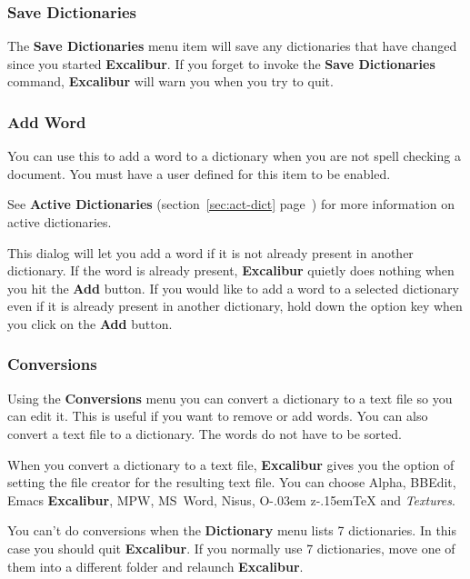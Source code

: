 ﻿\documentclass[11pt,titlepage]{article}
\newcommand{\ex}{\textbf{Excalibur}}
\newcommand{\oz}{O\kern-.03em z\kern-.15em\TeX}
\newcommand{\textures}{\emph{Textures}}
\begin{document}
\subsubsection{Save Dictionaries}

The \textbf{Save Dictionaries} menu item will save any dictionaries
that have changed since you started \ex. If you forget to invoke the
\textbf{Save Dictionaries} command, \ex{} will warn you when you try
to quit.

\subsubsection{Add Word}

You can use this to add a word to a dictionary when you are not spell
checking a document. You must have a user defined
 for this item to be
enabled.
\begin{latexonly}
  See \textbf{Active Dictionaries} (section~\ref{sec:act-dict}
  page~\pageref{sec:act-dict}) for more information on active
  dictionaries.
\end{latexonly}

This dialog will let you add a word if it is not already present in
another dictionary.  If the word is already present, \ex{} quietly
does nothing when you hit the \textbf{Add} button.  If you would like
to add a word to a selected dictionary even if it is already present
in another dictionary, hold down the option key when you click on the
\textbf{Add} button.

\subsubsection{Conversions}

Using the \textbf{Conversions} menu you can convert a dictionary to a
text file so you can edit it. This is useful if you want to remove or
add words. You can also convert a text file to a dictionary. The words
do not have to be sorted.

When you convert a dictionary to a text file, \ex{} gives you the
option of setting the file creator for the resulting text file.  You
can choose Alpha, BBEdit, Emacs \ex, MPW, MS~Word, Nisus, \oz{} and
\textures.

You can't do conversions when the \textbf{Dictionary} menu lists 7
dictionaries. In this case you should quit \ex. If you normally use 7
dictionaries, move one of them into a different folder and relaunch
\ex.
\end{document}
